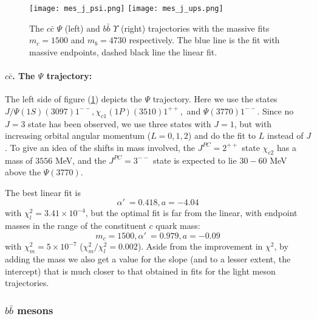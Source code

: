 \documentclass[11pt,a4]{article}
\newcommand{\alp}{\ensuremath{\alpha'\:}}
\newcommand{\ccb}{c\bar{c}}
\newcommand{\bbb}{b\bar{b}}
\newcommand{\rchi}[1]{\ensuremath{\chi^2_m/\chi^2_l = #1}}
\newcommand{\ten}[1]{\times10^{#1}}
\begin{document}
				\begin{figure}[tbp] \centering
						\texttt{[image: mes\_j\_psi.png]}	 \hfill
						\texttt{[image: mes\_j\_ups.png]}	 \hfill
						\caption{\label{fig:psi_ups} The \(\ccb\) \(\Psi\) (left) and \(\bbb\) \(\Upsilon\) (right) trajectories with the massive fits \(m_c = 1500\) and \(m_b = 4730\) respectively. The blue line is the fit with massive endpoints, dashed black line the linear fit.}
				\end{figure}
			
				\paragraph{\(\ccb\). The \(\Psi\) trajectory:} The left side of figure (\ref{fig:psi_ups}) depicts the \(\Psi\) trajectory. Here we use the states \(J/\Psi(1S)(3097)1^{--}, \chi_{c1}(1P)(3510)1^{++},\) and \(\Psi(3770)1^{--}\). Since no \(J = 3\) state has been observed, we use three states with \(J = 1\), but with increasing orbital angular momentum (\(L = 0,1,2\)) and do the fit to \(L\) instead of \(J\). To give an idea of the shifts in mass involved, the \(J^{PC} = 2^{++}\) state \(\chi_{c2}\) has a mass of \(3556\) MeV, and the \(J^{PC} = 3^{--}\) state is expected to lie \(30-60\) MeV above the \(\Psi(3770)\)\cite{Eichten:2007qx}.
				
				The best linear fit is
				\[ \alp = 0.418, a = -4.04 \]
				with \(\chi^2_l = 3.41\ten{-4}\), but the optimal fit is far from the linear, with endpoint masses in the range of the constituent \(c\) quark mass:
				\[ m_c = 1500, \alp = 0.979, a = -0.09 \]
				with \(\chi^2_m = 5\ten{-7}\) (\rchi{0.002}). Aside from the improvement in \(\chi^2\), by adding the mass we also get a value for the slope (and to a lesser extent, the intercept) that is much closer to that obtained in fits for the light meson trajectories.
				
			\subsubsection{\texorpdfstring{$\bbb$}{b-bbar} mesons}
\end{document}
